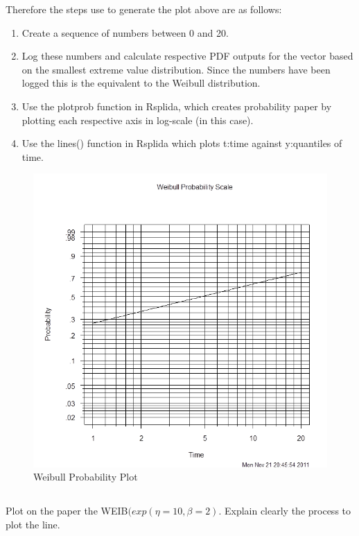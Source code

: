 \documentclass{article}
\begin{document}
Therefore the steps use to generate the plot above are as follows:\\
\begin{enumerate}
\item Create a sequence of numbers between 0 and 20.\\

\item Log these numbers and calculate respective PDF outputs for the vector based on the smallest extreme value distribution.  Since the numbers have been logged this is the equivalent to the Weibull distribution.

\item Use the plotprob function in Rsplida, which creates probability paper by plotting each respective axis in log-scale (in this case).

\item Use the lines() function in Rsplida which plots t:time against y:quantiles of time.
\end{enumerate}


\FloatBarrier
\begin{figure}
  \centering
  \includegraphics[width = 5in]{weibull_graph_2.png}
  \caption{Weibull Probability Plot}
\end{figure}
\FloatBarrier

\subsection{}
Plot on the paper the WEIB\begin{math}(exp(\eta = 10, \beta = 2).\end{math}
Explain clearly the process to plot the line.\\
\end{document}
